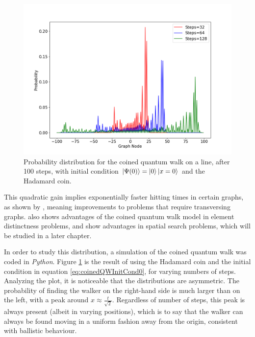 \documentclass[../../dissertation.tex]{subfiles}
\begin{document}
\begin{figure}[!h]
	\centering
	\includegraphics[scale=0.40]{img/CoinedQuantumWalk/CoinedMultiple_psi0_3264128.png}
	\caption{Probability distribution for the coined quantum walk on a line, after 100 steps, with initial condition $\ket{\Psi(0)}=\ket{0}\ket{x=0}$ and the Hadamard coin.} 
	\label{fig:coinedQWDist0}
\end{figure}
This quadratic gain implies exponentially faster hitting times in certain graphs, as shown by \cite{childs2002}, meaning improvements to problems that require transversing graphs. \cite{ambainis2003} also shows advantages of the coined quantum walk model in element distinctness problems, and \cite{childs2004} show advantages in spatial search problems, which will be studied in a later chapter.\par
In order to study this distribution, a simulation of the coined quantum walk was coded in \textit{Python}. Figure \ref{fig:coinedQWDist0} is the result of using the Hadamard coin and the initial condition in equation \ref{eq:coinedQWInitCond0}, for varying numbers of steps. Analyzing the plot, it is noticeable that the distributions are asymmetric. The probability of finding the walker on the right-hand side is much larger than on the left, with a peak around $x \approx \frac{t}{\sqrt{2}}$. Regardless of number of steps, this peak is always present (albeit in varying positions), which is to say that the walker can always be found moving in a uniform fashion away from the origin, consistent with ballistic behaviour.\par 
\end{document}
